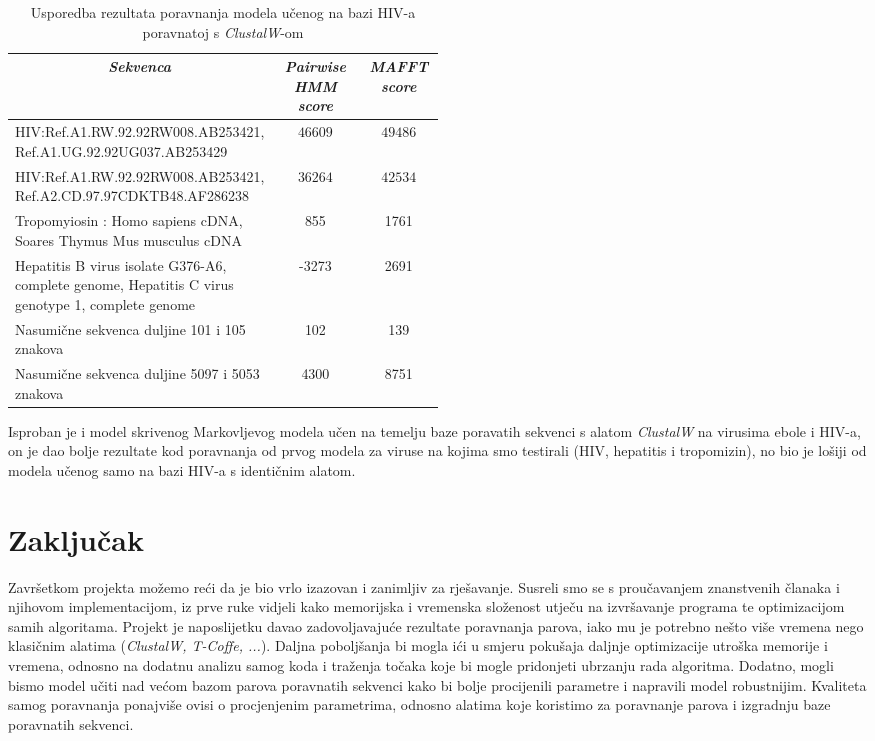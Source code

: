 \documentclass[a4paper]{article}
\begin{document}
\begin{table}[H]
\centering
\begin{tabular}{|p{0.5\linewidth}|c| c|}
\hline
\multicolumn{1}{|c|}{\textit{\textbf{Sekvenca}}} & \multicolumn{1}{c|}{\textit{\textbf{Pairwise HMM score }}} & \multicolumn{1}{c|}{\textit{\textbf{MAFFT score}}}                                      \tabularnewline \hline
HIV:Ref.A1.RW.92.92RW008.AB253421, Ref.A1.UG.92.92UG037.AB253429 & $46609$ & $49486$  \\ \hline
HIV:Ref.A1.RW.92.92RW008.AB253421, Ref.A2.CD.97.97CDKTB48.AF286238 & $36264$ & $42534$  \\ \hline
Tropomyiosin : Homo sapiens cDNA, Soares Thymus Mus musculus cDNA & 855 & 1761 \\ \hline
Hepatitis B virus isolate G376-A6, complete genome, Hepatitis C virus genotype 1, complete genome  &-3273 & 2691 \\ \hline
Nasumične sekvenca duljine 101 i 105 znakova  & 102 & 139 \\\hline
Nasumične sekvenca duljine 5097 i 5053 znakova  & 4300 & 8751 \\\hline

\end{tabular}
\caption{Usporedba rezultata poravnanja modela učenog na bazi HIV-a poravnatoj s \textit{ClustalW}-om }
\label{table:economicSchools}   
\end{table}
Isproban je i model skrivenog Markovljevog modela učen na temelju baze poravatih sekvenci s alatom \textit{ClustalW} na virusima ebole i HIV-a, on je dao bolje rezultate kod poravnanja od prvog modela za viruse na kojima smo testirali (HIV, hepatitis i tropomizin), no bio je lošiji od modela učenog samo na bazi HIV-a s identičnim alatom.
\newpage
\section{Zaključak}
Završetkom projekta možemo reći da je bio vrlo izazovan i zanimljiv za rješavanje. Susreli smo se s proučavanjem znanstvenih članaka i njihovom implementacijom, iz prve ruke vidjeli kako memorijska i vremenska složenost utječu na izvršavanje programa te optimizacijom samih algoritama. Projekt je naposlijetku davao zadovoljavajuće rezultate poravnanja parova, iako mu je potrebno nešto više vremena nego klasičnim alatima (\textit{ClustalW, T-Coffe, ...}). Daljna poboljšanja bi mogla ići u smjeru pokušaja daljnje optimizacije utroška memorije i vremena, odnosno na dodatnu analizu samog koda i traženja točaka koje bi mogle pridonjeti ubrzanju rada algoritma. Dodatno, mogli bismo model učiti nad većom bazom parova poravnatih sekvenci kako bi bolje procijenili parametre  i napravili model robustnijim. Kvaliteta samog poravnanja ponajviše ovisi o procjenjenim parametrima, odnosno alatima koje koristimo za poravnanje parova i izgradnju baze poravnatih sekvenci. 
\newpage
\end{document}
